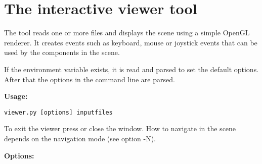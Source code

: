 
\section{The interactive viewer tool}

The tool  reads one or more files and displays the
scene using a simple OpenGL renderer. It creates events such as
keyboard, mouse or joystick events that can be used by the components
in the scene.

If the environment variable  exists, it
is read and parsed to set the default options. After that the options
in the command line are parsed.

{\bf Usage:}

\begin{verbatim}
viewer.py [options] inputfiles
\end{verbatim}

To exit the viewer press  or close the window. How to
navigate in the scene depends on the navigation mode (see option -N).

{\bf Options:}

